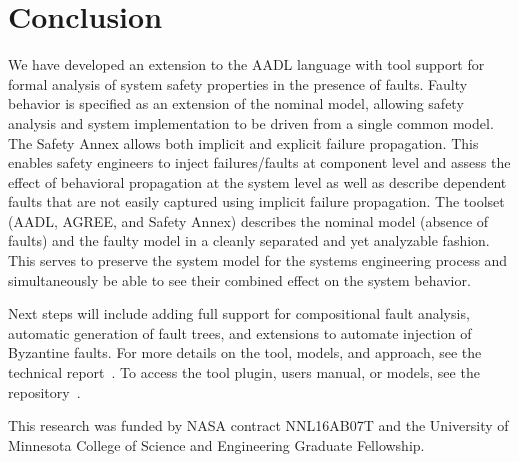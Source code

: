 \section{Conclusion}


We have developed an extension to the AADL language with tool support for formal analysis of system safety properties in the presence of faults. Faulty behavior is specified as an extension of the nominal model, allowing safety analysis and system implementation to be driven from a single common model. The Safety Annex allows both implicit and explicit failure propagation. This enables safety engineers to inject failures/faults at component level and assess the effect of behavioral propagation at the system level as well as describe dependent faults that are not easily captured using implicit failure propagation. The toolset (AADL, AGREE, and Safety Annex) describes the nominal model (absence of faults) and the faulty model in a cleanly separated and yet analyzable fashion. This serves to preserve the system model for the systems engineering process and simultaneously be able to see their combined effect on the system behavior. 

Next steps will include adding full support for compositional fault analysis, automatic generation of fault trees, and extensions to automate injection of Byzantine faults. For more details on the tool, models, and approach, see the technical report~\cite{SATechReport}. To access the tool plugin, users manual, or models, see the repository~\cite{SAGithub}. 


\vspace{2 mm}
 This research was funded by NASA contract NNL16AB07T and the University of Minnesota College of Science and Engineering Graduate Fellowship.


